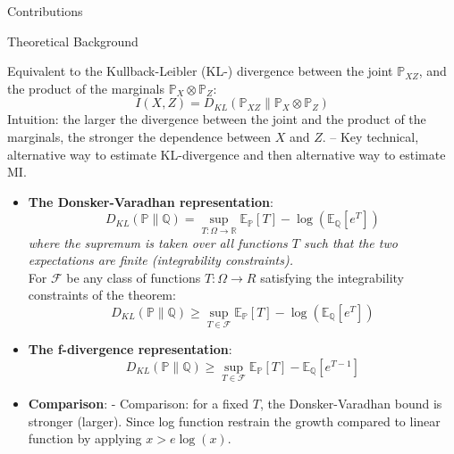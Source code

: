 \documentclass[final]{beamer}
\newlength{\colwidth}
\begin{document}
\begin{frame}[t]
\begin{columns}[t]
\begin{column}{\colwidth}
\begin{block}{Contributions}
\begin{enumerate}
    \end{enumerate}

\end{block}
  
\begin{block}{Theoretical Background}

      Equivalent to the Kullback-Leibler (KL-) divergence between the joint $\mathbb P_{XZ}$, and the product of the marginals $\mathbb P_X\otimes\mathbb P_Z$:
      \begin{equation}
          I(X, Z) = D_{KL}(\mathbb{P}_{XZ} \| \mathbb{P}_X \otimes \mathbb{P}_Z)
      \end{equation}
      Intuition: the larger the divergence between the joint and the product of the marginals, the stronger the dependence between $X$ and $Z$.
      -- Key technical, alternative way to estimate KL-divergence and then alternative way to estimate MI.
        \begin{itemize}
        \item \textbf{The Donsker-Varadhan representation}:
            \begin{equation}
                D_{KL}(\mathbb{P} \| \mathbb{Q}) = \sup_{T:\Omega\to\mathbb{R}} \mathbb{E}_\mathbb{P}[T] - \log(\mathbb{E}_\mathbb{Q}[e^T])
            \end{equation}
            \textit{where the supremum is taken over all functions $T$ such that the two expectations are finite (integrability constraints). }\\
            For $\mathcal F$ be any class of functions $T : \Omega \to R$ satisfying the integrability constraints of the theorem:
            \begin{equation}
                D_{KL}(\mathbb{P} \| \mathbb{Q}) \geq \sup_{T \in \mathcal{F}} \mathbb{E}_{\mathbb{P}}[T] - \log(\mathbb{E}_{\mathbb{Q}}[e^T])
            \end{equation}
        \item \textbf{The f-divergence representation}:
        \begin{equation}
            D_{KL}(\mathbb{P} \| \mathbb{Q}) \geq \sup_{T \in \mathcal{F}} \mathbb{E}_{\mathbb{P}}[T] - \mathbb{E}_{\mathbb{Q}}[e^{T-1}]
        \end{equation}
        \item \textbf{Comparison}: - Comparison: for a fixed $T$, the Donsker-Varadhan bound is stronger (larger). Since log function restrain the growth compared to linear function by applying $x > e\log(x)$.
        \end{itemize}


\end{block}
\end{column}
\end{columns}
\end{frame}
\end{document}
